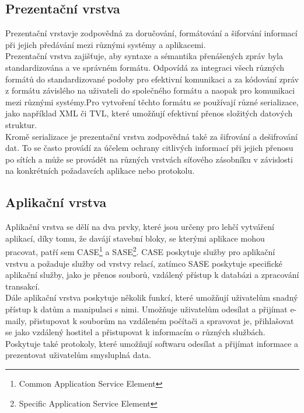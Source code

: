 \documentclass[12pt]{report}			%
\begin{document}
\cite{session1}
\cite{session2}
				\subsection{Prezentační vrstva}
Prezentační vrstavje zodpovědná za doručování, formátování a šiforvání informací při jejich předávání mezi různými systémy a aplikacemi.
\\
Prezentační vrstva zajišťuje, aby syntaxe a sémantika přenášených zpráv byla standardizována a ve správném formátu. Odpovídá za integraci všech různých formátů do standardizované podoby pro efektivní komunikaci a za kódování zpráv z formátu závislého na uživateli do společného formátu a naopak pro komunikaci mezi různými systémy.Pro vytvoření těchto formátu se používají různé serializace, jako například XML či TVL, které umožňují efektivní přenos složitých datových struktur. 
\\
Kromě serializace je prezentační vrstva zodpovědná také za šifrování a dešifrování dat. To se často provádí za účelem ochrany citlivých informací při jejich přenosu po sítích a může se provádět na různých vrstvách síťového zásobníku v závislosti na konkrétních požadavcích aplikace nebo protokolu.


\cite{presentation1}
\cite{presentation2}
\cite{presentation3}

				\subsection{Aplikační vrstva}
Aplikační vrstva se dělí na dva prvky, které jsou určeny pro lehčí vytváření aplikací, díky tomu, že davájí stavební bloky, se kterými aplikace mohou pracovat, patří sem CASE\footnote{Common Application Service Element} a SASE\footnote{Specific Application Service Element}. CASE poskytuje služby pro aplikační vrstvu a požaduje služby od vrstvy relací, zatímco SASE poskytuje specifické aplikační služby, jako je přenos souborů, vzdálený přístup k databázi a zpracování transakcí.
\\
Dále aplikační vrstva poskytuje několik funkcí, které umožňují uživatelům snadný přístup k datům a manipulaci s nimi. Umožňuje uživatelům odesílat a přijímat e-maily, přistupovat k souborům na vzdáleném počítači a spravovat je, přihlašovat se jako vzdálený hostitel a přistupovat k informacím o různých službách. Poskytuje také protokoly, které umožňují softwaru odesílat a přijímat informace a prezentovat uživatelům smysluplná data.


\cite{aplication1}
\cite{aplication2}
\cite{aplication3}
\end{document}
